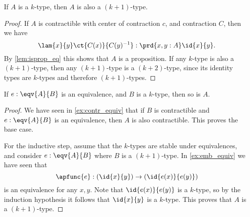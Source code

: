 
\begin{thm}
If $A$ is a $k$-type, then $A$ is also a $(k+1)$-type.
\end{thm}

\begin{proof}
If $A$ is contractible with center of contraction $c$, and contraction $C$, then we have
\begin{equation*}
\lam{x}{y} \ct{C(x)}{C(y)^{-1}} : \prd{x,y:A}\id{x}{y}.
\end{equation*}
By \autoref{lem:isprop_eq} this shows that $A$ is a proposition. If any $k$-type is also a $(k+1)$-type, then any $(k+1)$-type is a $(k+2)$-type, since its identity types are $k$-types and therefore $(k+1)$-types.
\end{proof}

\begin{thm}
If $e:\eqv{A}{B}$ is an equivalence, and $B$ is a $k$-type, then so is $A$.
\end{thm}

\begin{proof}
We have seen in \autoref{ex:contr_equiv} that if $B$ is contractible and $e:\eqv{A}{B}$ is an equivalence, then $A$ is also contractible. This proves the base case.

For the inductive step, assume that the $k$-types are stable under equivalences, and consider $e:\eqv{A}{B}$ where $B$ is a $(k+1)$-type. In \autoref{ex:emb_equiv} we have seen that
\begin{equation*}
\apfunc{e}:(\id{x}{y})\to(\id{e(x)}{e(y)})
\end{equation*}
is an equivalence for any $x,y$. Note that $\id{e(x)}{e(y)}$ is a $k$-type, so by the induction hypothesis it follows that $\id{x}{y}$ is a $k$-type. This proves that $A$ is a $(k+1)$-type.
\end{proof}


